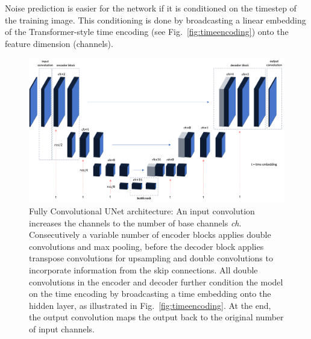 Noise prediction is easier for the network if it is conditioned on the timestep of the training image. This conditioning is done by broadcasting a linear embedding of the Transformer-style time encoding (see Fig.~\ref{fig:timeencoding}) onto the feature dimension (channels).~\autocite{vaswani2017attention}
\begin{figure}
    \centering
    \includegraphics[width=.7\textwidth]{images/unet.png}
    \caption[Fully Convolutional UNet]{Fully Convolutional UNet architecture: An input convolution increases the channels to the number of base channels \textit{ch}. Consecutively a variable number of encoder blocks applies double convolutions and max pooling, before the decoder block applies transpose convolutions for upsampling and double convolutions to incorporate information from the skip connections. All double convolutions in the encoder and decoder further condition the model on the time encoding by broadcasting a time embedding onto the hidden layer, as illustrated in Fig.~\ref{fig:timeencoding}. At the end, the output convolution maps the output back to the original number of input channels.}
    \label{fig:unetconv}
\end{figure}

